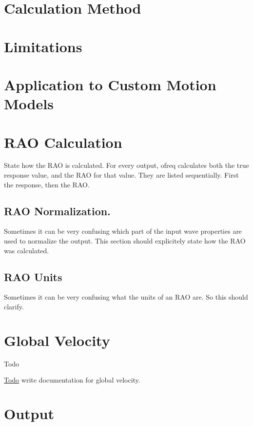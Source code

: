 \section*{Calculation Method}

\section*{Limitations}

\section*{Application to Custom Motion Models}

\section*{R\-A\-O Calculation}

State how the R\-A\-O is calculated. For every output, ofreq calculates both the true response value, and the R\-A\-O for that value. They are listed sequentially. First the response, then the R\-A\-O.

\subsection*{R\-A\-O Normalization.}

Sometimes it can be very confusing which part of the input wave properties are used to normalize the output. This section should explicitely state how the R\-A\-O was calculated.

\subsection*{R\-A\-O Units}

Sometimes it can be very confusing what the units of an R\-A\-O are. So this should clarify. \hypertarget{global_velocity}{}\section{Global Velocity}\label{global_velocity}
\begin{DoxyRefDesc}{Todo}
\item[\hyperlink{todo__todo000016}{Todo}]write documentation for global velocity.\end{DoxyRefDesc}


\section*{Output}

